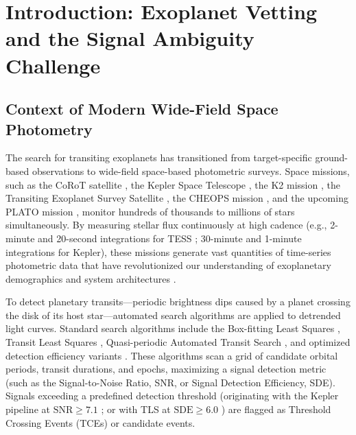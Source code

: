 \section{Introduction: Exoplanet Vetting and the Signal Ambiguity Challenge} \label{sec:introduction}

\subsection{Context of Modern Wide-Field Space Photometry} \label{sec:intro_context}
The search for transiting exoplanets has transitioned from target-specific ground-based observations to wide-field space-based photometric surveys. Space missions, such as the CoRoT satellite \citep{Baglin2006}, the Kepler Space Telescope \citep{Borucki2010, Koch2010, Batalha2013}, the K2 mission \citep{Howell2014}, the Transiting Exoplanet Survey Satellite \citep[TESS;][]{Ricker2015, Vanderspek2018, Guerrero2021}, the CHEOPS mission \citep{Benz2021}, and the upcoming PLATO mission \citep{Rauer2014}, monitor hundreds of thousands to millions of stars simultaneously. By measuring stellar flux continuously at high cadence (e.g., 2-minute and 20-second integrations for TESS \citealt{Jenkins2016}; 30-minute and 1-minute integrations for Kepler), these missions generate vast quantities of time-series photometric data that have revolutionized our understanding of exoplanetary demographics and system architectures \citep{Howard2012, Petigura2013, Winn2015, Fulton2017}.

To detect planetary transits---periodic brightness dips caused by a planet crossing the disk of its host star---automated search algorithms are applied to detrended light curves. Standard search algorithms include the Box-fitting Least Squares \citep[BLS;][]{Kovacs2002}, Transit Least Squares \citep[TLS;][]{Hippke2019}, Quasi-periodic Automated Transit Search \citep[QATS;][]{Carter2013}, and optimized detection efficiency variants \citep{Tingley2005, Ofir2014}. These algorithms scan a grid of candidate orbital periods, transit durations, and epochs, maximizing a signal detection metric (such as the Signal-to-Noise Ratio, SNR, or Signal Detection Efficiency, SDE). Signals exceeding a predefined detection threshold (originating with the Kepler pipeline at $\text{SNR} \ge 7.1$ \citealt{Jenkins2002, Jenkins2010}; or with TLS at $\text{SDE} \ge 6.0$ \citealt{Hippke2019}) are flagged as Threshold Crossing Events (TCEs) or candidate events.

